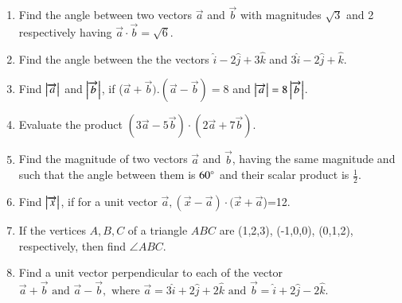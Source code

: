 \begin{enumerate}[label=\thesection.\arabic*,ref=\thesection.\theenumi]
\item Find the angle between two vectors $\overrightarrow{a}$ and $\overrightarrow {b} $ with magnitudes $\sqrt{3}$ and 2 respectively having $\overrightarrow {a}\cdot\overrightarrow {b}=\sqrt{6}$.
		\label{prob:12/10/3/1/inner}
	\\
	\solution
		
\item Find the angle between the the vectors $\hat{i}-2\hat{j}+3\hat{k}$ and $3\hat{i}-2\hat{j}+\hat{k}$.
	\\
	\solution
		
\item Find $\left\vert\overrightarrow {a}\right\vert$ and $\left\vert\overrightarrow {b}\right\vert$, if ($\overrightarrow {a}+\overrightarrow {b}). (\overrightarrow {a}-\overrightarrow {b})=8$ and $\left\vert\overrightarrow {a}\right\vert=8\left\vert\overrightarrow {b}\right\vert$.
	\\
	\solution
		
\item Evaluate the product $(3\overrightarrow {a}-5\overrightarrow {b})\cdot (2\overrightarrow {a}+7\overrightarrow {b})$.
	\\
	\solution
		
\item Find the magnitude of two vectors $\overrightarrow {a}$ and $\overrightarrow {b}$, having the same magnitude and such that the angle between them is $60\degree$ and their scalar product is $\frac{1}{2}$.
	\\
	\solution
		
\item Find $\left\vert\overrightarrow {x}\right\vert$, if for a unit vector $\overrightarrow {a}, (\overrightarrow {x}-\overrightarrow {a})\cdot (\overrightarrow {x}+\overrightarrow {a}$)=12.
	\\
\solution 
		
\item If the vertices $A,B,C$ of a triangle $ABC$ are (1,2,3), (-1,0,0), (0,1,2), respectively, then find  $\angle{ABC}$.
	\\
	\solution
		
\item Find a unit vector perpendicular to each of the vector $\overrightarrow{a}+\overrightarrow{b}\text{ and }\overrightarrow{a}-\overrightarrow{b},\text{ where } \overrightarrow{a}=3\hat{i}+2\hat{j}+2\hat{k}\text{ and } \overrightarrow{b}=\hat{i}+2\hat{j}-2\hat{k}$. 
	\\
		\solution

\end{enumerate}
